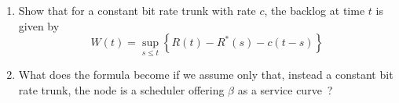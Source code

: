 \begin{problem}

\begin{enumerate}
        \item  Show that for a constant bit rate trunk with rate $c$, the backlog at
time $t$ is given by
$$
W(t) = \sup_{s \leq t} \left \{ R(t) - R^{*}(s) - c(t-s) \right \}
$$

        \item  What does the formula become if we assume only that,
        instead a constant bit rate trunk, the node is a scheduler
offering $\beta$ as a service curve~?
\end{enumerate}

\end{problem}

